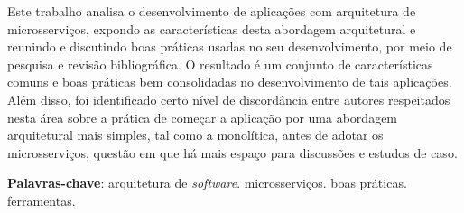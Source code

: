 \setlength{\absparsep}{18pt} %
\begin{resumo}

Este trabalho analisa o desenvolvimento de aplicações com arquitetura de microsserviços, expondo as características desta abordagem arquitetural e reunindo e discutindo boas práticas usadas no seu desenvolvimento, por meio de pesquisa e revisão bibliográfica. O resultado é um conjunto de características comuns e boas práticas bem consolidadas no desenvolvimento de tais aplicações. Além disso, foi identificado certo nível de discordância entre autores respeitados nesta área sobre a prática de começar a aplicação por uma abordagem arquitetural mais simples, tal como a monolítica, antes de adotar os microsserviços, questão em que há mais espaço para discussões e estudos de caso. 


 \textbf{Palavras-chave}: arquitetura de \emph{software}. microsserviços. boas práticas. ferramentas.
\end{resumo}